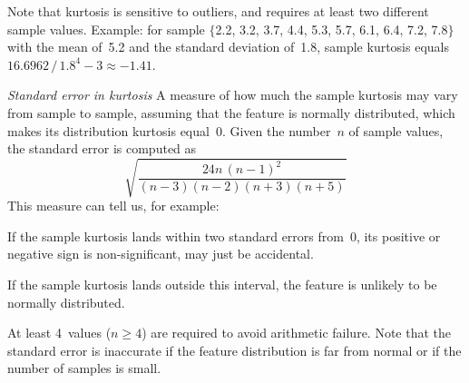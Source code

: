 \begin{Description}
Note that kurtosis is sensitive to outliers, and requires at least two different
sample values.  Example: for sample
$\{$2.2, 3.2, 3.7, 4.4, 5.3, 5.7, 6.1, 6.4, 7.2, 7.8$\}$
with the mean of~5.2 and the standard deviation of~1.8,
sample kurtosis equals $16.6962\,{/}\,1.8^4 - 3 \approx -1.41$.
\item[\it Standard error in kurtosis]
\OutputRowText{\OutputRowIDStErrorCurtosis}
A measure of how much the sample kurtosis may vary from sample to sample,
assuming that the feature is normally distributed, which makes its
distribution kurtosis equal~0.
Given the number~$n$ of sample values, the standard error is computed as
\begin{equation*}
\sqrt{\frac{24n\,(n-1)^2}{(n-3)(n-2)(n+3)(n+5)}}
\end{equation*}
This measure can tell us, for example:
\begin{Itemize}
\item If the sample kurtosis lands within two standard errors from~0, its
positive or negative sign is non-significant, may just be accidental.
\item If the sample kurtosis lands outside this interval, the feature
is unlikely to be normally distributed.
\end{Itemize}
At least 4~values ($n\geq 4$) are required to avoid arithmetic failure.
Note that the standard error is inaccurate if the feature distribution is
far from normal or if the number of samples is small.
\end{Description}


